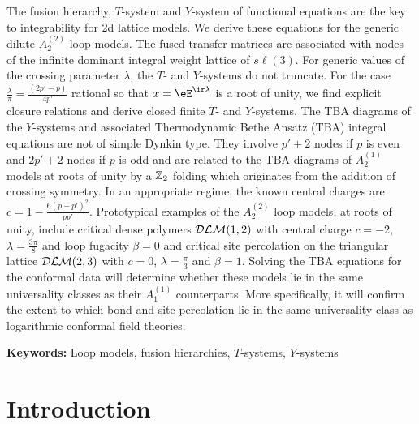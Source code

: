 \documentclass[11pt]{article}
\numberwithin{equation}{section}
\theoremstyle{plain}
\numberwithin{equation}{section}
\begin{document}
The fusion hierarchy, $T$-system and $Y$-system of functional equations are the key to integrability for 2d lattice models. We derive these equations for the generic dilute $A_2^{(2)}$ loop models. 
The fused transfer matrices are associated with nodes of the infinite dominant integral weight lattice of $s\ell(3)$. For generic values of the crossing parameter $\lambda$, the $T$- and $Y$-systems do not truncate. For the case $\frac{\lambda}{\pi}=\frac{(2p'-p)}{4p'}$ rational so that $x=\eE^{\ir \lambda}$ is a root of unity, we find explicit closure relations and derive closed finite $T$- and $Y$-systems. 
The TBA diagrams of the $Y$-systems and associated Thermodynamic Bethe Ansatz (TBA) integral equations are not of simple Dynkin type. They involve $p'+2$ nodes if $p$ is even and $2p'+2$ nodes if $p$ is odd and are related to the 
TBA diagrams of $A_2^{(1)}$ models at roots of unity by a ${\Bbb Z}_2$ folding which originates from the addition of crossing symmetry. 
In an appropriate regime, the known central charges are $c=1-\frac{6(p-p')^2}{pp'}$. 
Prototypical examples of the $A_2^{(2)}$ loop models, at roots of unity, include critical dense polymers ${\cal DLM}(1,2)$ with central charge $c=-2$, $\lambda=\frac{3\pi}{8}$ and loop fugacity $\beta=0$
and critical site percolation on the triangular lattice ${\cal DLM}(2,3)$ with $c=0$, $\lambda=\frac{\pi}{3}$ and $\beta=1$. Solving the TBA equations for the conformal data will determine whether these models lie in the same universality classes as their $A_1^{(1)}$ counterparts. More specifically, it will confirm the extent to which bond and site percolation lie in the same universality class as logarithmic conformal field theories.

\vspace{.5cm}
\noindent\textbf{Keywords:} Loop models, fusion hierarchies, $T$-systems, $Y$-systems\\


\newpage
\tableofcontents

\newpage
{}

\setcounter{footnote}{0}

\section{Introduction}
\end{document}
